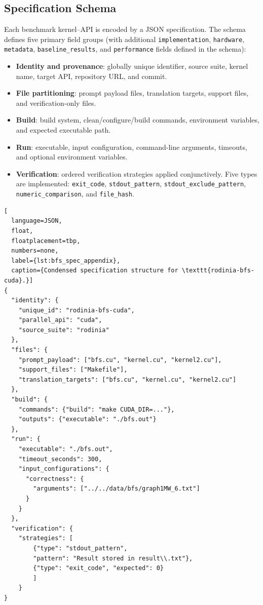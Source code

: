 \subsection{Specification Schema}
\label{sec:appendix-a-schema}

Each benchmark kernel–API is encoded by a JSON specification. The schema defines five primary field groups (with additional \texttt{implementation}, \texttt{hardware}, \texttt{metadata}, \texttt{baseline\_results}, and \texttt{performance} fields defined in the schema):

\begin{itemize}
    \item \textbf{Identity and provenance}: globally unique identifier, source suite, kernel name, target API, repository URL, and commit.
    \item \textbf{File partitioning}: prompt payload files, translation targets, support files, and verification-only files.
    \item \textbf{Build}: build system, clean/configure/build commands, environment variables, and expected executable path.
    \item \textbf{Run}: executable, input configuration, command-line arguments, timeouts, and optional environment variables.
    \item \textbf{Verification}: ordered verification strategies applied conjunctively. Five types are implemented: \texttt{exit\_code}, \texttt{stdout\_pattern}, \texttt{stdout\_exclude\_pattern}, \texttt{numeric\_comparison}, and \texttt{file\_hash}.
\end{itemize}

\begin{lstlisting}[
  language=JSON,
  float,
  floatplacement=tbp,
  numbers=none,
  label={lst:bfs_spec_appendix},
  caption={Condensed specification structure for \texttt{rodinia-bfs-cuda}.}]
{
  "identity": {
    "unique_id": "rodinia-bfs-cuda",
    "parallel_api": "cuda",
    "source_suite": "rodinia"
  },
  "files": {
    "prompt_payload": ["bfs.cu", "kernel.cu", "kernel2.cu"],
    "support_files": ["Makefile"],
    "translation_targets": ["bfs.cu", "kernel.cu", "kernel2.cu"]
  },
  "build": {
    "commands": {"build": "make CUDA_DIR=..."},
    "outputs": {"executable": "./bfs.out"}
  },
  "run": {
    "executable": "./bfs.out",
    "timeout_seconds": 300,
    "input_configurations": {
      "correctness": {
        "arguments": ["../../data/bfs/graph1MW_6.txt"]
      }
    }
  },
  "verification": {
    "strategies": [
        {"type": "stdout_pattern",
        "pattern": "Result stored in result\\.txt"},
        {"type": "exit_code", "expected": 0}
        ]
    }
}
\end{lstlisting}

